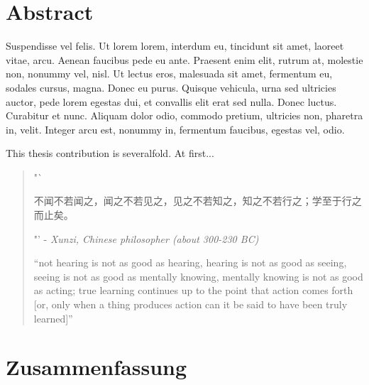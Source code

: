 \chapter*{Abstract}\label{sec:abstract}


Suspendisse vel felis. Ut lorem lorem, interdum eu, tincidunt sit amet, laoreet vitae, arcu. Aenean faucibus pede eu ante. Praesent enim elit, rutrum at, molestie non, nonummy vel, nisl. Ut lectus eros, malesuada sit amet, fermentum eu, sodales cursus, magna. Donec eu purus. Quisque vehicula, urna sed ultricies auctor, pede lorem egestas dui, et convallis elit erat sed nulla. Donec luctus. Curabitur et nunc. Aliquam dolor odio, commodo pretium, ultricies non, pharetra in, velit. Integer arcu est, nonummy in, fermentum faucibus, egestas vel, odio.

\lipsum[6]

This thesis contribution is severalfold. At first...
\lipsum[6]

\lipsum[6]

    \begin{quote}
    "`\begin{CJK}{UTF8}{gbsn}不闻不若闻之，闻之不若见之，见之不若知之，知之不若行之；学至于行之而止矣。\end{CJK}"' -
    \textit{Xunzi, Chinese philosopher (about 300-230 BC)}

    "`not hearing is not as good as hearing, hearing is not as good as
       seeing, seeing is not as good as mentally knowing, mentally knowing is
       not as good as acting; true learning continues up to the point that
       action comes forth [or, only when a thing produces action can it be said
      to have been truly learned]"'
    \end{quote}

\cleardoublepage
\chapter*{Zusammenfassung}\label{sec:zusammenfassung}
\lipsum[6]

\lipsum[6]

\lipsum[6]

\lipsum[6]
\cleardoublepage
